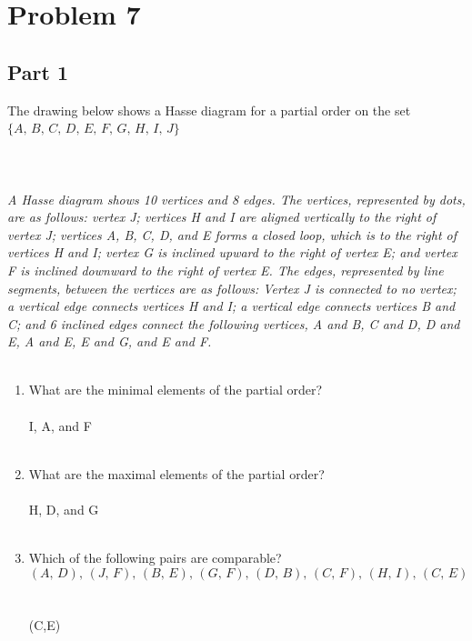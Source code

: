 \documentclass{amsart}
\theoremstyle{definition}
\theoremstyle{Exercise}
\theoremstyle{remark}
\theoremstyle{rule}
\numberwithin{equation}{section}
\begin{document}
\section*{Problem 7}
\subsection*{Part 1} The drawing below shows a Hasse diagram for a partial order on the set $\{A,\, B,\, C,\, D,\, E,\, F,\, G,\, H,\, I,\, J\}$
\\
\\
\\
\\
{\color{blue}{\bf Figure 3:} \emph{A Hasse diagram shows 10 vertices and 8 edges. The vertices, represented by dots, are as follows: vertex J; vertices H and I are aligned vertically to the right of vertex J; vertices A, B, C, D, and E forms a closed loop, which is to the right of vertices H and I; vertex G is inclined upward to the right of vertex E; and vertex F is inclined downward to the right of vertex E. The edges, represented by line segments, between the vertices are as follows: Vertex J is connected to no vertex; a vertical edge connects vertices H and I; a vertical edge connects vertices B and C; and 6 inclined edges connect the following vertices, A and B, C and D, D and E, A and E, E and G, and E and F.
}
}
\\
\\

\begin{enumerate}[label=(\alph*)]
\item What are the minimal elements of the partial order?\\\\
I, A, and F
\\\\

\item What are the maximal elements of the partial order?\\\\
H, D, and G
\\\\

\item Which of the following pairs are comparable?\\
\[
(A, \,D),\, (J,\, F),\, (B,\, E),\, (G, \,F),\, (D,\, B),\, (C, \,F),\, (H,\, I), \,(C,\, E)
\]\\\\
(C,E)
\\\\

\end{enumerate}
\end{document}
